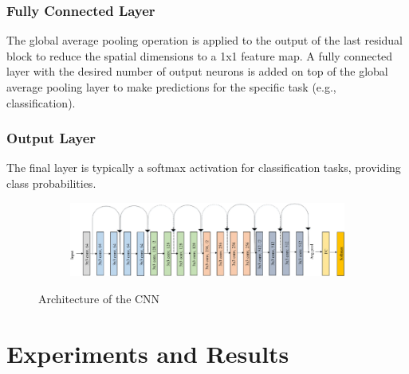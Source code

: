 \documentclass[10pt,twocolumn,letterpaper]{article}
\begin{document}
\subsubsection{Fully Connected Layer}
The global average pooling operation is applied to the output of the last residual block to reduce the spatial dimensions to a 1x1 feature map. A fully connected layer with the desired number of output neurons is added on top of the global average pooling layer to make predictions for the specific task (e.g., classification).

\subsubsection{Output Layer}
The final layer is typically a softmax activation for classification tasks, providing class probabilities.

\begin{figure}
    \centering
    \begin{subfigure}{0.5\textwidth}
        \includegraphics[width=\linewidth]{ResNet18 - 1.png}
    \end{subfigure}
    \caption{Architecture of the CNN}
    \label{fig:enter-label}
\end{figure}

\section{Experiments and Results}

\end{document}
